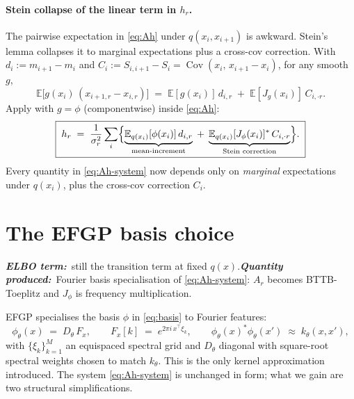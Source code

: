 \documentclass[11pt]{article}
\newcommand{\E}{\mathbb{E}}
\newcommand{\Eqx}{\mathbb{E}_{q(x_i)}}
\newcommand{\Cov}{\operatorname{Cov}}
\newcommand{\elbobanner}[2]{%
\par\noindent\textbf{\textit{ELBO term:}}\ #1\quad\textbf{\textit{Quantity produced:}}\ #2\par\medskip}
\begin{document}
\paragraph{Stein collapse of the linear term in $h_r$.}
The pairwise expectation in \eqref{eq:Ah} under $q(x_i, x_{i+1})$ is
awkward. Stein's lemma collapses it to marginal expectations plus a
cross-cov correction. With $d_i := m_{i+1}-m_i$ and $C_i := S_{i,i+1}-S_i
= \Cov(x_i,\, x_{i+1}-x_i)$, for any smooth $g$,
\begin{equation}
\E\bigl[g(x_i)\,(x_{i+1,r}-x_{i,r})\bigr]
\;=\;
\E[g(x_i)]\,d_{i,r}
\;+\;
\E[J_g(x_i)]\,C_{i,\cdot r}.
\end{equation}
Apply with $g=\phi$ (componentwise) inside \eqref{eq:Ah}:
\begin{equation}
\boxed{\;
h_r
\;=\;
\frac{1}{\sigma_r^2}\sum_i
\Bigl\{
\underbrace{\Eqx[\phi(x_i)]\,d_{i,r}}_{\text{mean-increment}}
\;+\;
\underbrace{\Eqx[J_\phi(x_i)]^{*}\,C_{i,\cdot r}}_{\text{Stein correction}}
\Bigr\}.
\;}
\label{eq:hr-stein-abstract}
\end{equation}
Every quantity in \eqref{eq:Ah-system} now depends only on \emph{marginal}
expectations under $q(x_i)$, plus the cross-cov correction $C_i$.

\section{The EFGP basis choice}
\label{sec:efgp}

\elbobanner{still the transition term at fixed $q(x)$.}{Fourier basis
specialisation of \eqref{eq:Ah-system}: $A_r$ becomes BTTB-Toeplitz and
$J_\phi$ is frequency multiplication.}

EFGP specialises the basis $\phi$ in \eqref{eq:basis} to Fourier features:
\begin{equation}
\phi_\theta(x) \;=\; D_\theta\, F_x,
\qquad
F_x[k] \;=\; e^{2\pi i\, x^\top \xi_k},
\qquad
\phi_\theta(x)^{*}\phi_\theta(x') \;\approx\; k_\theta(x,x'),
\label{eq:efgp-features}
\end{equation}
with $\{\xi_k\}_{k=1}^{M}$ an equispaced spectral grid and $D_\theta$
diagonal with square-root spectral weights chosen to match $k_\theta$.
This is the only kernel approximation introduced. The system
\eqref{eq:Ah-system} is unchanged in form; what we gain are two
structural simplifications.
\end{document}
